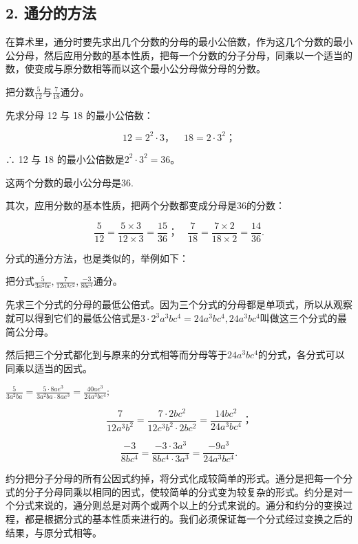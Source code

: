 \subsection{2. 通分的方法}

在算术里，通分时要先求出几个分数的分母的最小公倍数，作为这几个分数的最小公分母，然后应用分数的基本性质，把每一个分数的分子分母，同乘以一个适当的数，使变成与原分数相等而以这个最小公分母做分母的分数。

 把分数\(\frac{5}{12}\)与\(\frac{7}{18}\)通分。

先求分母 12 与 18 的最小公倍数：

\[
12 = 2 ^{2} \cdot 3\text{，} \quad 18 = 2 \cdot 3 ^{2}\text{；}
\]

∴ 12 与 18 的最小公倍数是\(2^{2} \cdot 3^{2} = 36\)。

这两个分数的最小公分母是36.

其次，应用分数的基本性质，把两个分数都变成分母是36的分数：

\[
\frac{5}{12} = \frac{5 \times 3}{12 \times 3} = \frac{15}{36}\text{；} \quad \frac{7}{18} = \frac{7 \times 2}{18 \times 2} = \frac{14}{36}.
\]

分式的通分方法，也是类似的，举例如下：

把分式\(\frac{5}{3a^2bc}, \frac{7}{12a^3c^2}, \frac{-3}{8bc^4}\)通分。

先求三个分式的分母的最低公倍式。因为三个分式的分母都是单项式，所以从观察就可以得到它们的最低公倍式是\(3 \cdot 2^{3} a^{3} b c^{4} = 24 a^{3} b c^{4}, 24 a^{3} b c^{4}\)叫做这三个分式的最简公分母。

然后把三个分式都化到与原来的分式相等而分母等于\(24a^{3}b c^{4}\)的分式，各分式可以同乘以适当的因式。

\(\frac{5}{3a^2ba} = \frac{5\cdot 8a e^3}{3a^2ba\cdot 8a e^3} = \frac{40a e^3}{24a^3b e^4};\)

\[
\frac{7}{12 a ^{3} b ^{2}} = \frac{7 \cdot 2 b c ^{2}}{12 c ^{3} b ^{2} \cdot 2 b c ^{2}} = \frac{14 b c ^{2}}{24 a ^{3} b c ^{4}}\text{；}
\]

\[
\frac{- 3}{8 b c ^{4}} = \frac{- 3 \cdot 3 a ^{3}}{8 b c ^{4} \cdot 3 a ^{3}} = \frac{- 9 a ^{3}}{24 a ^{3} b c ^{4}}.
\]

约分把分子分母的所有公因式约掉，将分式化成较简单的形式。通分是把每一个分式的分子分母同乘以相同的因式，使较简单的分式变为较复杂的形式。约分是对一个分式来说的，通分则总是对两个或两个以上的分式来说的。通分和约分的变换过程，都是根据分式的基本性质来进行的。我们必须保证每一个分式经过变换之后的结果，与原分式相等。

